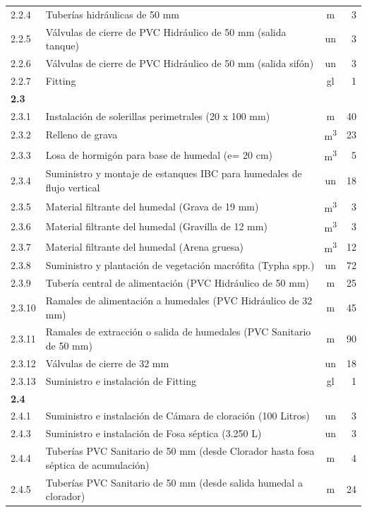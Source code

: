 \begin{longtable}{@{}l>{\raggedright\arraybackslash}p{10.2cm}cr@{}}
  2.2.4 & Tuberías hidráulicas de 50 mm & m & 3 \\
  2.2.5 & Válvulas de cierre de PVC Hidráulico de 50 mm (salida tanque) & un & 3 \\
  2.2.6 & Válvulas de cierre de PVC Hidráulico de 50 mm (salida sifón) & un & 3 \\
  2.2.7 & Fitting & gl & 1 \\
  \textbf{2.3} & \multicolumn{3}{l}{\textit{Construcción del Humedal y sistema hidráulico}} \\
  2.3.1 & Instalación de solerillas perimetrales (20 x 100 mm) & m & 40 \\
  2.3.2 & Relleno de grava & \unit{\cubic\meter} & 23 \\
  2.3.3 & Losa de hormigón para base de humedal (e= 20 cm) & \unit{\cubic\meter} & 5 \\
  2.3.4 & Suministro y montaje de estanques IBC para humedales de flujo vertical & un & 18 \\
  2.3.5 & Material filtrante del humedal (Grava de 19 mm) & \unit{\cubic\meter} & 3 \\
  2.3.6 & Material filtrante del humedal (Gravilla de 12 mm) & \unit{\cubic\meter} & 3 \\
  2.3.7 & Material filtrante del humedal (Arena gruesa) & \unit{\cubic\meter} & 12 \\
  2.3.8 & Suministro y plantación de vegetación macrófita (Typha spp.) & un & 72 \\
  2.3.9 & Tubería central de alimentación (PVC Hidráulico de 50 mm) & m & 25 \\
  2.3.10 & Ramales de alimentación a humedales (PVC Hidráulico de 32 mm) & m & 45 \\
  2.3.11 & Ramales de extracción o salida de humedales (PVC Sanitario de 50 mm) & m & 90 \\
  2.3.12 & Válvulas de cierre de 32 mm & un & 18 \\
  2.3.13 & Suministro e instalación de Fitting & gl & 1 \\
  \textbf{2.4} & \multicolumn{3}{l}{\textit{Recolección de efluentes}} \\
  2.4.1 & Suministro e instalación de Cámara de cloración (100 Litros) & un & 3 \\
  2.4.3 & Suministro e instalación de Fosa séptica (3.250 L) & un & 3 \\
  2.4.4 & Tuberías PVC Sanitario de 50 mm (desde Clorador hasta fosa séptica de acumulación) & m & 4 \\
  2.4.5 & Tuberías PVC Sanitario de 50 mm (desde salida humedal a clorador) & m & 24 \\

\end{longtable}

